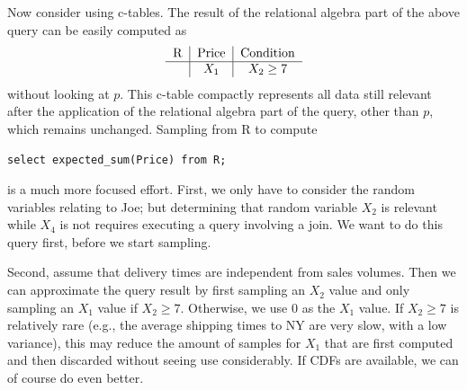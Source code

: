 \begin{example}
Now consider using c-tables. The result of the relational algebra part of the
above query can be easily computed as
\[
\begin{tabular}{c|c|c}
R & Price & Condition \\
\hline
& $X_1$ & $X_2 \ge 7$ \\
\end{tabular}
\]
without looking at $p$.
This c-table compactly represents all data still relevant after the
application of the relational algebra part of the query, other than $p$,
which remains unchanged.
Sampling from R to compute
\begin{verbatim}
select expected_sum(Price) from R;
\end{verbatim}
is a much more focused effort.
First, we only have to consider the random variables relating to Joe;
but determining that random variable $X_2$ is relevant while $X_4$
is not requires
executing a query involving a join. We want to do this query first, before
we start sampling.

Second, assume that delivery times are
independent from sales volumes. Then we can approximate the
query result
by first sampling an $X_2$ value and only sampling an $X_1$ value if $X_2 \ge 7$.
Otherwise, we use $0$ as the $X_1$ value.
If $X_2 \ge 7$ is relatively rare (e.g., the average shipping times to NY are
very slow, with a low variance), this may reduce the amount of samples
for $X_1$ that are first computed and then discarded without seeing use
considerably.
If CDFs are available, we can of course do even better.
%
\end{example}